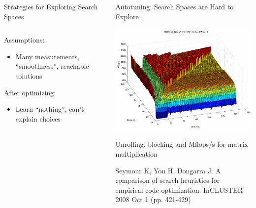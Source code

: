 \documentclass[11pt, compress, aspectratio=169, xcolor={table,usenames,dvipsnames}]{beamer}
\begin{document}
\begin{frame}
\begin{columns}
\begin{column}{0.89\columnwidth}
\begin{columns}
\begin{column}[t]{0.48\columnwidth}
\begin{block}{Strategies for Exploring Search Spaces}
\begin{columns}
\begin{column}{0.39\columnwidth}
Assumptions:
\vspace{0.3em}
\begin{itemize}
\item \alert{Many measurements}, \alert{``smoothness''}, \alert{reachable solutions}
\end{itemize}
\vspace{0.3em}
After optimizing:
\vspace{0.3em}
\begin{itemize}
\item \alert{Learn ``nothing''}, \alert{can't explain choices}
\end{itemize}
\end{column}
\end{columns}
\end{block}
\end{column}
\begin{column}[t]{0.48\columnwidth}
\begin{block}{Autotuning: Search Spaces are Hard to Explore}
\begin{center}
\includegraphics[width=.7\columnwidth]{../../../img/seymour2008comparison.pdf}
\end{center}

\begin{center}
{\footnotesize
\alert{Unrolling}, \alert{blocking} and \alert{Mflops/s} for \alert{matrix multiplication}
}

\tiny{Seymour K, You H, Dongarra J. A comparison of search heuristics for \\ empirical code optimization. InCLUSTER 2008 Oct 1 (pp. 421-429)}
\vspace{1.3em}
\end{center}


\end{block}
\end{column}
\end{columns}
\end{column}
\end{columns}
\end{frame}
\end{document}
